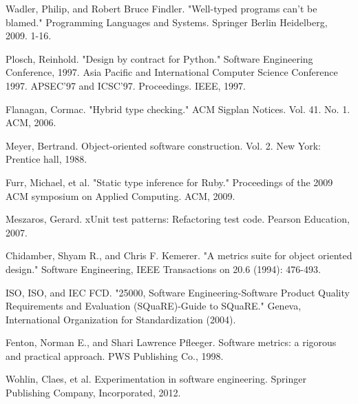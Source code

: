 \documentclass[preprint]{sigplanconf}
\begin{document}
\begin{thebibliography}{}
Wadler, Philip, and Robert Bruce Findler. "Well-typed programs can’t be blamed." Programming Languages and Systems. Springer Berlin Heidelberg, 2009. 1-16.

Plosch, Reinhold. "Design by contract for Python." Software Engineering Conference, 1997. Asia Pacific and International Computer Science Conference 1997. APSEC'97 and ICSC'97. Proceedings. IEEE, 1997.

Flanagan, Cormac. "Hybrid type checking." ACM Sigplan Notices. Vol. 41. No. 1. ACM, 2006.

Meyer, Bertrand. Object-oriented software construction. Vol. 2. New York: Prentice hall, 1988.

Furr, Michael, et al. "Static type inference for Ruby." Proceedings of the 2009 ACM symposium on Applied Computing. ACM, 2009.

Meszaros, Gerard. xUnit test patterns: Refactoring test code. Pearson Education, 2007.

Chidamber, Shyam R., and Chris F. Kemerer. "A metrics suite for object oriented design." Software Engineering, IEEE Transactions on 20.6 (1994): 476-493.

ISO, ISO, and IEC FCD. "25000, Software Engineering-Software Product Quality Requirements and Evaluation (SQuaRE)-Guide to SQuaRE." Geneva, International Organization for Standardization (2004).

Fenton, Norman E., and Shari Lawrence Pfleeger. Software metrics: a rigorous and practical approach. PWS Publishing Co., 1998.

Wohlin, Claes, et al. Experimentation in software engineering. Springer Publishing Company, Incorporated, 2012.

\end{thebibliography}
\end{document}
